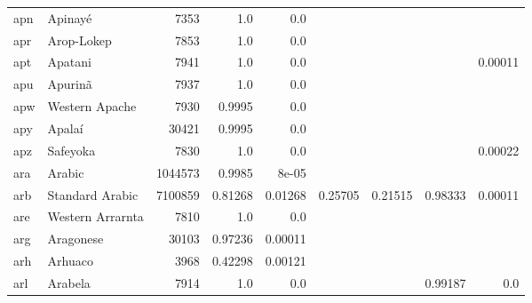 \documentclass[11pt]{article}
\begin{document}
\begin{table*}[h]
{\begin{tabular}{llrrrrrrr}
apn         & Apinayé         & 7353         & 1.0         & 0.0         &          &          &          &          \\

apr         & Arop-Lokep         & 7853         & 1.0         & 0.0         &          &          &          &          \\

apt         & Apatani         & 7941         & 1.0         & 0.0         &          &          &          & 0.00011         \\

apu         & Apurinã         & 7937         & 1.0         & 0.0         &          &          &          &          \\

apw         & Western Apache         & 7930         & 0.9995         & 0.0         &          &          &          &          \\

apy         & Apalaí         & 30421         & 0.9995         & 0.0         &          &          &          &          \\

apz         & Safeyoka         & 7830         & 1.0         & 0.0         &          &          &          & 0.00022         \\

ara         & Arabic         & 1044573         & 0.9985         & 8e-05         &          &          &          &          \\

arb         & Standard Arabic         & 7100859         & 0.81268         & 0.01268         & 0.25705         & 0.21515         & 0.98333         & 0.00011         \\

are         & Western Arrarnta         & 7810         & 1.0         & 0.0         &          &          &          &          \\

arg         & Aragonese         & 30103         & 0.97236         & 0.00011         &          &          &          &          \\

arh         & Arhuaco         & 3968         & 0.42298         & 0.00121         &          &          &          &          \\

arl         & Arabela         & 7914         & 1.0         & 0.0         &          &          & 0.99187         & 0.0         \\


\end{tabular}}
\end{table*}
\end{document}
